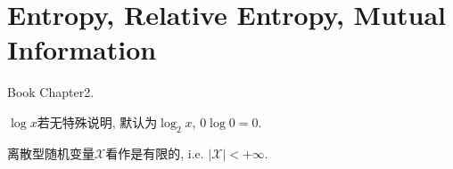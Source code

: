 \chapter{Entropy, Relative Entropy, Mutual Information}
Book Chapter2.

$\log x$若无特殊说明, 默认为$\log_2 x$, $0\log 0=0$.

离散型随机变量$\mathcal{X}$看作是有限的, i.e. $|\mathcal{X}|<+\infty$.




